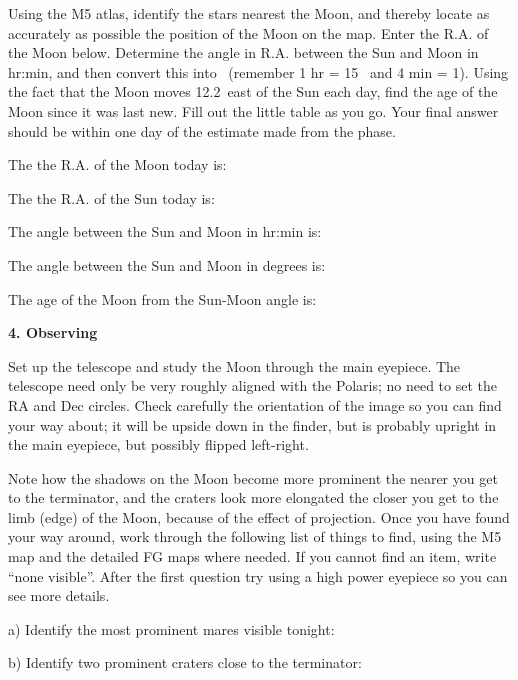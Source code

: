 \medskip\noindent 
Using the M5 atlas, identify the stars nearest the Moon, and thereby locate as
accurately as possible the position of the Moon on the map.
Enter the R.A. of the Moon below. Determine the angle in R.A. between
the Sun and
Moon in hr:min, and then convert this into \deg\ (remember 1 hr = 15
\deg\, and 4 min = 1\deg). Using the fact that the Moon moves 12.2\deg\
east of the Sun each day, find the age of the Moon since it was last
new. Fill out the little table as you go. Your final answer should be
within one day of the estimate made from the phase.

\medskip
The the R.A. of the  Moon today is: \hfill \makebox[2cm]{\hrulefill} 

\medskip
The the R.A. of the  Sun today is: \hfill \makebox[2cm]{\hrulefill} 

\medskip
The angle between the Sun and Moon in hr:min is: \hfill \makebox[2cm]{\hrulefill} 

\medskip
The angle between the Sun and Moon in degrees is: \hfill
\makebox[2cm]{\hrulefill} 

\medskip
The age of the Moon from the Sun-Moon angle is: \hfill
\makebox[2cm]{\hrulefill} 
 
\bigskip
\medskip
\noindent
{\bf 4. Observing}

\medskip\noindent
Set up the telescope and study the Moon through the main eyepiece. The
telescope need only be very roughly aligned with the Polaris; no need
to set the RA and Dec circles. Check carefully the orientation of the
image so you can find your way about; it will be upside down in the
finder, but is probably upright in the main eyepiece, but possibly
flipped left-right.

Note how the shadows on the Moon become more prominent the nearer you
get to the terminator, and the craters look more elongated the closer
you get to the limb (edge) of the Moon, because of the effect of
projection. Once you have found your way around, work through the
following list of things to find, using the M5 map and the detailed FG
maps where needed.  If you cannot find an item, write
``none visible''. After the first question try using
a high power eyepiece so you can see more details.

\bigskip 

a) Identify the most prominent mares visible tonight: \hfill
\makebox[4cm]{\hrulefill}

\medskip
b) Identify two prominent craters close to the terminator: \hfill
\makebox[4cm]{\hrulefill}

